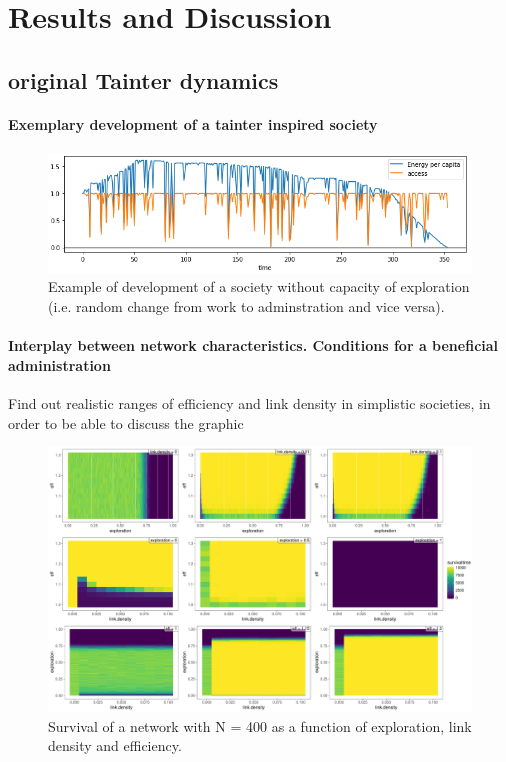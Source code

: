 \section{Results and Discussion}

\subsection{original Tainter dynamics}

\paragraph{Exemplary development of a tainter inspired society}

\begin{figure}[htb]
    \centering
    \includegraphics[width=\linewidth]{../figures/network_dev_noexplore.png}
    \caption{Example of development of a society without capacity of exploration (i.e. random change from work to adminstration and vice versa). }
    \label{fig:baseNetworkDev}
\end{figure}


\paragraph{Interplay between network characteristics. Conditions for a beneficial administration}

Find out realistic ranges of efficiency and link density in simplistic societies, in order to be able to discuss the graphic


\begin{figure}[htb]
    \centering
    \includegraphics[width = \linewidth]{../figures/survivaltime.pdf}
    \caption{Survival of a network with N = 400 as a function of exploration, link density and efficiency.}
    \label{fig:survival}
\end{figure}


